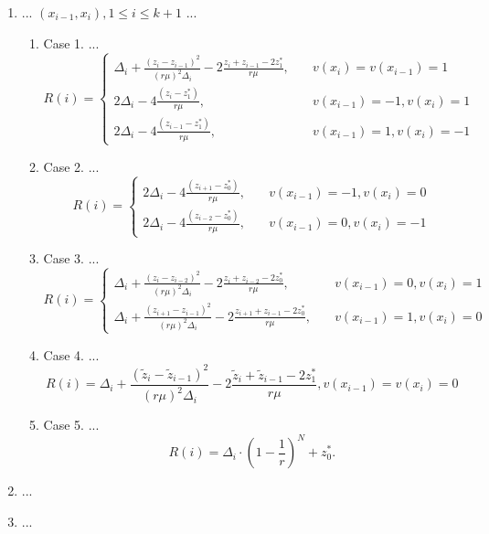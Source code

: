 \documentclass[runningheads]{llncs}
\begin{document}
\begin{enumerate}
  \item ... $(x_{i-1}, x_i), 1 \leq i \leq k+1$ ...
      \begin{enumerate} 
        \item Case 1. ...
\begin{equation}
R(i)=
  \begin{cases}
     \Delta _i+\frac {{(z_i-z_{i-1})}^2}{{(r \mu)}^2 \Delta _i} - 2 \frac {z_i+z_{i-1}-2z_1^*}{r \mu}, & {\quad  v(x_i)=v(x_{i-1})=1}\\
    2 \Delta _i-4 \frac {(z_i-z_1^*)}{r \mu}, & {\quad  v(x_{i-1})=-1, v(x_i)=1}\\
    2 \Delta _i-4 \frac {(z_{i-1}-z_1^*)}{r \mu}, & {\quad  v(x_{i-1})=1, v(x_i)=-1}
  \end{cases}
\end{equation}
        \item Case 2. ...
\begin{equation}
R(i)=
  \begin{cases}
    2 \Delta _i-4 \frac {(z_{i+1}-z_0^*)}{r \mu}, & {\quad  v(x_{i-1})=-1, v(x_i)=0}\\
    2 \Delta _i-4 \frac {(z_{i-2}-z_0^*)}{r \mu}, & {\quad  v(x_{i-1})=0, v(x_i)=-1}
  \end{cases}
\end{equation}
        \item Case 3. ...
\begin{equation}
R(i)=
  \begin{cases}
     \Delta _i+\frac {{(z_i-z_{i-2})}^2}{{(r \mu)}^2 \Delta _i} - 2 \frac {z_i+z_{i-2}-2z_0^*}{r \mu}, & {\quad  v(x_{i-1})=0, v(x_i)=1}\\
     \Delta _i+\frac {{(z_{i+1}-z_{i-1})}^2}{{(r \mu)}^2 \Delta _i} - 2 \frac {z_{i+1}+z_{i-1}-2z_0^*}{r \mu}, & {\quad  v(x_{i-1})=1, v(x_i)=0}
  \end{cases}
\end{equation}
        \item Case 4. ...
\begin{equation}
R(i)=\Delta _i+\frac {{(\tilde{z}_i-\tilde{z}_{i-1})}^2}{{(r \mu)}^2 \Delta _i} - 2 \frac {\tilde{z}_i+\tilde{z}_{i-1}-2z_1^*}{r \mu}, v(x_{i-1})=v(x_i)=0
\end{equation}
        \item Case 5. ...
\begin{equation}
R(i)=\Delta _i \cdot {\left( 1-\frac {1}{r} \right)}^N+z_0^*.
\end{equation}
    \end{enumerate} 
  \item ...
  \item ...
\end{enumerate}
\end{document}
